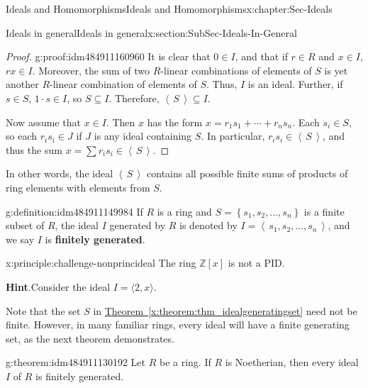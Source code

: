 \documentclass[oneside,10pt,]{book}
\newcommand{\blocktitlefont}{\relax}
\newcommand{\xreffont}{\relax}
\newcommand{\terminology}[1]{\textbf{#1}}
\numberwithin{equation}{section}
\newcommand{\ideal}[1]{\left\langle\, #1 \,\right\rangle}
\newcommand{\set}[1]{\left\{ {#1} \right\}}
\def\Z{{\mathbb Z}}
\begin{document}
\begin{chapterptx}{Ideals and Homomorphisms}{}{Ideals and Homomorphisms}{}{}{x:chapter:Sec-Ideals}
\begin{sectionptx}{Ideals in general}{}{Ideals in general}{}{}{x:section:SubSec-Ideals-In-General}
\begin{proof}{}{g:proof:idm484911160960}
It is clear that \(0\in I\), and that if \(r\in R\) and \(x\in I\), \(rx\in I\). Moreover, the sum of two \(R\)-linear combinations of elements of \(S\) is yet another \(R\)-linear combination of elements of \(S\). Thus, \(I\) is an ideal. Further, if \(s\in S\), \(1\cdot s \in I\), so \(S\subseteq I\). Therefore, \(\ideal{S}\subseteq I\).%
\par
Now assume that \(x\in I\). Then \(x\) has the form \(x = r_1 s_1 + \cdots + r_n s_n\). Each \(s_i \in S\), so each \(r_i s_i \in J\) if \(J\) is any ideal containing \(S\). In particular, \(r_i s_i \in \ideal{S}\), and thus the sum \(x = \sum r_i s_i \in \ideal{S}\).%
\end{proof}
In other words, the ideal \(\ideal{S}\) contains all possible finite sums of products of ring elements with elements from \(S\).%
\begin{definition}{}{g:definition:idm484911149984}%
If \(R\) is a ring and \(S = \set{s_1, s_2, \ldots,
s_n}\) is a finite subset of \(R\), the ideal \(I\) generated by \(R\) is denoted by \(I = \ideal{s_1, s_2, \ldots,
s_n}\), and we say \(I\) is \terminology{finitely generated}.%
\end{definition}
\begin{principle}{}{}{x:principle:challenge-nonprincideal}%
The ring \(\Z[x]\) is not a PID.%

\textbf{\blocktitlefont Hint}.\quad{}Consider the ideal \(I = \langle 2, x \rangle\).%
\end{principle}
Note that the set \(S\) in \hyperref[x:theorem:thm_idealgeneratingset]{Theorem~{\xreffont\ref{x:theorem:thm_idealgeneratingset}}} need not be finite. However, in many familiar rings, every ideal will have a finite generating set, as the next theorem demonstrates.%
\begin{theorem}{}{}{g:theorem:idm484911130192}%
Let \(R\) be a ring. If \(R\) is Noetherian\footnotemark{}, then every ideal \(I\) of \(R\) is finitely generated.%


\end{theorem}
\end{sectionptx}
\end{chapterptx}
\end{document}
